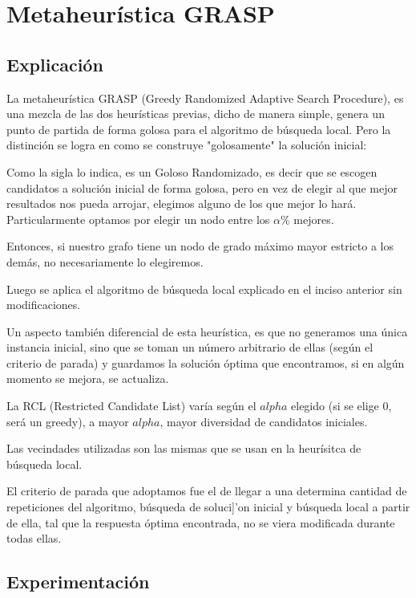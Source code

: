 \section{Metaheur\'istica GRASP}
\subsection{Explicaci\'on}
La metaheur\'istica GRASP (Greedy Randomized Adaptive Search Procedure), es una mezcla de las dos heur\'isticas previas, dicho de manera simple, genera un punto de partida de forma golosa para el algoritmo de b\'usqueda local. Pero la distinci\'on se logra en como se construye "golosamente" la soluci\'on inicial:

Como la sigla lo indica, es un Goloso Randomizado, es decir que se escogen candidatos a soluci\'on inicial de forma golosa, pero en vez de elegir al que mejor resultados nos pueda arrojar, elegimos alguno de los que mejor lo har\'a. Particularmente optamos por elegir un nodo entre los $\alpha$\% mejores.

Entonces, si nuestro grafo tiene un nodo de grado m\'aximo mayor estricto a los dem\'as, no necesariamente lo elegiremos.

Luego se aplica el algoritmo de b\'usqueda local explicado en el inciso anterior sin modificaciones.

Un aspecto tambi\'en diferencial de esta heur\'istica, es que no generamos una \'unica instancia inicial, sino que se toman un n\'umero arbitrario de ellas (seg\'un el criterio de parada) y guardamos la soluci\'on \'optima que encontramos, si en alg\'un momento se mejora, se actualiza.

La RCL (Restricted Candidate List) var\'ia seg\'un el $alpha$ elegido (si se elige 0, ser\'a un greedy), a mayor $alpha$, mayor diversidad de candidatos iniciales.

Las vecindades utilizadas son las mismas que se usan en la heur\'isitca de b\'usqueda local.

El criterio de parada que adoptamos fue el de llegar a una determina cantidad de repeticiones del algoritmo, b\'usqueda de soluci]'on inicial y b\'usqueda local a partir de ella, tal que la respuesta \'optima encontrada, no se viera modificada durante todas ellas.

\subsection{Experimentaci\'on}
